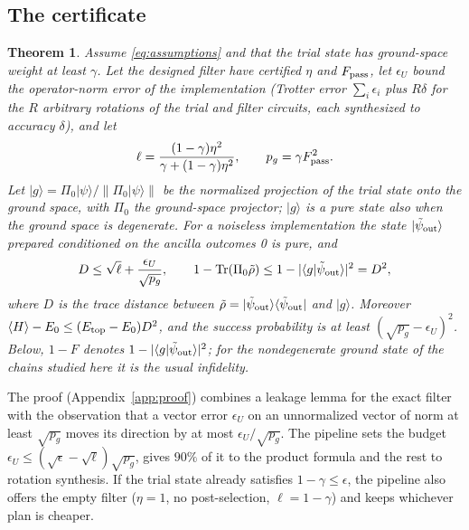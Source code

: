 \documentclass[aps,pra,twocolumn,superscriptaddress,nofootinbib]{revtex4-2}
\newtheorem{theorem}{Theorem}
\newcommand{\ket}[1]{|#1\rangle}
\newcommand{\bra}[1]{\langle#1|}
\newcommand{\norm}[1]{\lVert#1\rVert}
\begin{document}
\subsection{The certificate}

\begin{theorem}\label{thm:cert}
Assume \eqref{eq:assumptions} and that the trial state has ground-space weight at least $\gamma$. Let
the designed filter have certified $\eta$ and $F_{\rm pass}$, let $\epsilon_U$ bound the operator-norm
error of the implementation (Trotter error $\sum_i\epsilon_i$ plus $R\delta$ for the $R$ arbitrary
rotations of the trial and filter circuits, each synthesized to accuracy $\delta$), and let
\begin{equation}
\ell=\frac{(1-\gamma)\eta^2}{\gamma+(1-\gamma)\eta^2},\qquad p_g=\gamma F_{\rm pass}^2 .
\end{equation}
Let $\ket g=\Pi_0\ket\psi/\norm{\Pi_0\ket\psi}$ be the normalized projection of the trial state onto
the ground space, with $\Pi_0$ the ground-space projector; $\ket g$ is a pure state also when the
ground space is degenerate. For a noiseless implementation the state $\ket{\tilde\psi_{\rm out}}$
prepared conditioned on the ancilla outcomes 0 is pure, and
\begin{equation}
D\le\sqrt\ell+\frac{\epsilon_U}{\sqrt{p_g}},\qquad
1-\operatorname{Tr}(\Pi_0\tilde\rho)\le1-|\langle g|\tilde\psi_{\rm out}\rangle|^2=D^2,
\label{eq:cert}
\end{equation}
where $D$ is the trace distance between $\tilde\rho=\ket{\tilde\psi_{\rm out}}\bra{\tilde\psi_{\rm out}}$
and $\ket g$. Moreover $\langle H\rangle-E_0\le(E_{\rm top}-E_0)D^2$, and the success probability is at
least $(\sqrt{p_g}-\epsilon_U)^2$. Below, $1-F$ denotes $1-|\langle g|\tilde\psi_{\rm out}\rangle|^2$; for
the nondegenerate ground state of the chains studied here it is the usual infidelity.
\end{theorem}

The proof (Appendix~\ref{app:proof}) combines a leakage lemma for the exact filter with the
observation that a vector error $\epsilon_U$ on an unnormalized vector of norm at least $\sqrt{p_g}$
moves its direction by at most $\epsilon_U/\sqrt{p_g}$. The pipeline sets the budget
$\epsilon_U\le(\sqrt\epsilon-\sqrt\ell)\sqrt{p_g}$, gives $90\%$ of it to the product formula and the
rest to rotation synthesis. If the trial state already satisfies $1-\gamma\le\epsilon$, the pipeline
also offers the empty filter ($\eta=1$, no post-selection, $\ell=1-\gamma$) and keeps whichever plan
is cheaper.
\end{document}
